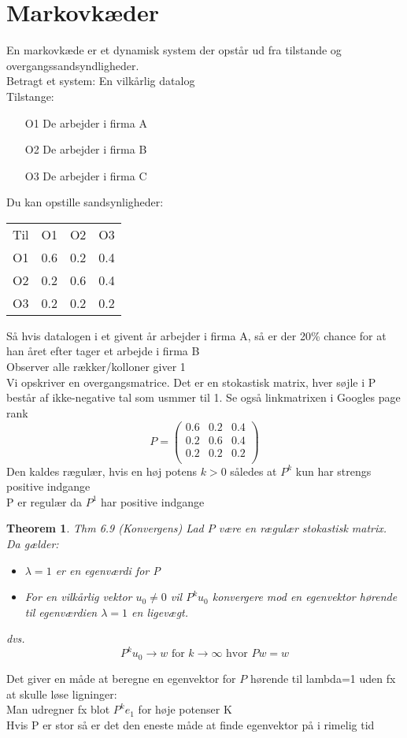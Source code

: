 \documentclass[a4paper,fleqn]{report}
\newtheorem{theorem}{Theorem}[chapter]
\begin{document}
	\section{Markovkæder}
	En markovkæde er et dynamisk system der opstår ud fra tilstande og 
	overgangssandsyndligheder. \\
	Betragt et system: En vilkårlig datalog\\
	Tilstange:\\
	\begin{itemize}
		\item[O1]De arbejder i firma A
		\item[O2]De arbejder i firma B
		\item[O3]De arbejder i firma C
	\end{itemize}
	Du kan opstille sandsynligheder:
	\begin{tabular}{c|ccc}
		Til\Fra&O1&O2&O3\\
		O1&0.6&0.2&0.4\\
		O2&0.2&0.6&0.4\\
		O3&0.2&0.2&0.2\\
	\end{tabular}
	Så hvis datalogen i et givent år arbejder i firma A, så er der 20\% chance for at han
	året efter tager et arbejde i firma B\\ Observer alle rækker/kolloner giver 1\\

	Vi opskriver en overgangsmatrice. Det er en stokastisk matrix, hver søjle i P består af
	ikke-negative tal som usmmer til 1. Se også linkmatrixen i Googles page rank
	\[
		P = \begin{pmatrix}
			0.6&0.2&0.4\\
			0.2&0.6&0.4\\
			0.2&0.2&0.2\\
		\end{pmatrix}
	\]
	Den kaldes rægulær, hvis en høj potens $k > 0$ således at $P^k$ kun har strengs positive
	indgange\\ P er regulær da $P^1$ har positive indgange\\
	\begin{theorem}Thm 6.9 (Konvergens)
		Lad $P$ være en rægulær stokastisk matrix. Da gælder:
		\begin{itemize}
			\item $\lambda = 1$ er en egenværdi for P
			\item For en vilkårlig vektor $u_0 \neq 0$ vil $P^ku_0$ konvergere mod en egenvektor
				hørende til egenværdien $\lambda = 1$ en ligevægt.
		\end{itemize}
		dvs.
		\[P^ku_0 \rightarrow w \text{ for } k \rightarrow \infty \text{ hvor } Pw = w\]
	\end{theorem}
	Det giver en måde at beregne en egenvektor for $P$ hørende til lambda=1 uden fx at skulle
	løse ligninger:\\
	Man udregner fx blot $P^ke_1$ for høje potenser K\\
	Hvis P er stor så er det den eneste måde at finde egenvektor på i rimelig tid\\
\end{document}
